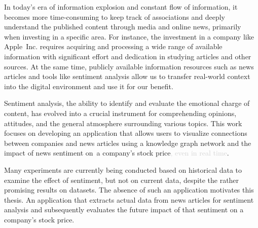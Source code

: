 

In today's era of information explosion and constant flow of information, it becomes more time-consuming to keep track of associations and deeply understand the published content through media and online news, primarily when investing in a specific area. For instance, the investment in a company like Apple~Inc. requires acquiring and processing a wide range of available information with significant effort and dedication in studying articles and other sources. At the same time, publicly available information resources such as news articles and tools like sentiment analysis allow us to transfer real-world context into the digital environment and use it for our benefit.

Sentiment analysis, the ability to identify and evaluate the emotional charge of content, has evolved into a crucial instrument for comprehending opinions, attitudes, and the general atmosphere surrounding various topics. This work focuses on developing an application that allows users to visualize connections between companies and news articles using a knowledge graph network and the impact of news sentiment on~a company's stock price\textcolor{lightgray}{, even in real time}.

Many experiments are currently being conducted based on historical data to examine the effect of sentiment, but not on current data, despite the rather promising results on datasets. The absence of such an application motivates this thesis. An application that extracts actual data from news articles for sentiment analysis and subsequently evaluates the future impact of that sentiment on a company's stock price.


 
